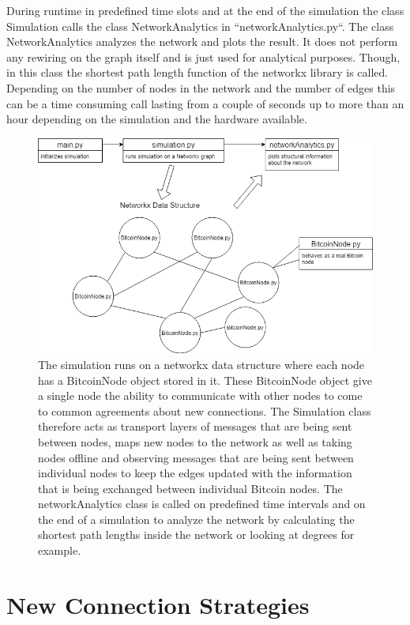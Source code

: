 \documentclass[a4paper, oneside]{discothesis}
\begin{document}
During runtime in predefined time slots and at the end of the simulation the class Simulation calls the class NetworkAnalytics in ``networkAnalytics.py``. The class NetworkAnalytics analyzes the network and plots the result. It does not perform any rewiring on the graph itself and is just used for analytical purposes. Though, in this class the shortest path length function of the networkx library is called. Depending on the number of nodes in the network and the number of edges this can be a  time consuming call lasting from a couple of seconds up to more than an hour depending on the simulation and the hardware available.

\begin{figure}
    \centering
    \includegraphics[width=1\columnwidth]{figures/BitcoinSimulationDiagram}
    \caption{The simulation runs on a networkx data structure where each node has a BitcoinNode object stored in it. These BitcoinNode object give a single node the ability to communicate with other nodes to come to common agreements about new connections. The Simulation class therefore acts as transport layers of messages that are being sent between nodes, maps new nodes to the network as well as taking nodes offline and observing messages that are being sent between individual nodes to keep the edges updated with the information that is being exchanged between individual Bitcoin nodes. The networkAnalytics class is called on predefined time intervals and on the end of a simulation to analyze the network by calculating the shortest path lengths inside the network or looking at degrees for example.}
    \label{fig:BitcoinSimulationDiagram}
\end{figure}

\chapter{New Connection Strategies}
\end{document}
